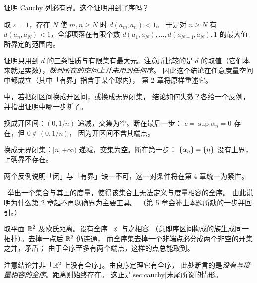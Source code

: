 \begin{exercise}[结构]
  \label{exr:cauchy-bounded}
  证明 Cauchy 列必有界。这个证明用到了序吗？
  \begin{solution}
    取 \(\varepsilon = 1\)，存在 \(N\) 使 \(m, n \ge N\) 时 \(d(a_{m}, a_{n}) < 1\)。
    于是对 \(n \ge N\) 有 \(d(a_{n}, a_{N}) < 1\)，全部项落在有限个数
    \(d(a_{1},a_{N}), \dots, d(a_{N-1},a_{N}), 1\) 的最大值所界定的范围内。

    证明只用到 \(d\) 的三条性质与有限集有最大元。注意所比较的是
    \(d\) 的取值（它们本来就是实数），\emph{数列所在的空间上并未用到任何序}。
    因此这个结论在任意度量空间中都成立（其中「有界」指含于某个球内），
    第 2 章将原样重述它。
  \end{solution}
\end{exercise}

\begin{exercise}[结构]
  \label{exr:nested-fail}
   中，若把闭区间换成开区间，或换成无界闭集，
  结论如何失效？各给一个反例，并指出证明中哪一步断了。
  \begin{solution}
    换成开区间：\((0, 1/n)\) 递减，交集为空。断在最后一步：
    \(c = \sup \alpha_{n} = 0\) 存在，但 \(0 \notin (0,1/n)\)，
    因为开区间不含其端点。

    换成无界闭集：\([n, +\infty)\) 递减，交集为空。断在第一步：
    \(\{\alpha_{n}\} = \{n\}\) 没有上界，上确界不存在。

    两个反例说明「闭」与「有界」缺一不可，这一对条件将在第 4 章统一为紧性。
  \end{solution}
\end{exercise}

\begin{exercise}[延伸]
  \label{exr:sup-not-metric}
  \needlater\
  举出一个集合与其上的度量，使得该集合上无法定义与度量相容的全序。
  由此说明为什么第 2 章起不再以确界为主要工具。
  （第 5 章会补上本题所缺的一步并回引。）
  \begin{solution}
    取平面 \(\mathbb{R}^{2}\) 及欧氏距离。设有全序 \(\preceq\) 与之相容
    （意即序区间构成的族生成同一拓扑）。去掉一点后 \(\mathbb{R}^{2}\) 仍连通，
    而全序集去掉一个非端点必分成两个非空的开集之并，矛盾；
    由于全序至多有两个端点，这样的点总能取到。

    注意结论并非「\(\mathbb{R}^{2}\) 上没有全序」。由良序定理它有全序，
    此处断言的是\emph{没有与度量相容的全序}。距离则始终存在。
    这正是\cref{sec:cauchy}末尾所说的情形。
  \end{solution}
\end{exercise}

